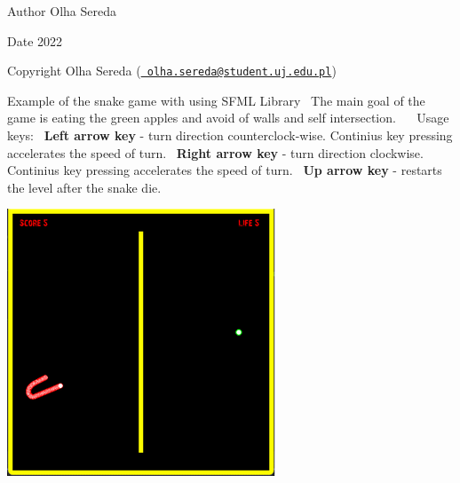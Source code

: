 \begin{DoxyAuthor}{Author}
Olha Sereda 
\end{DoxyAuthor}
\begin{DoxyDate}{Date}
2022 
\end{DoxyDate}
\begin{DoxyCopyright}{Copyright}
Olha Sereda (\href{mailto:olha.sereda@student.uj.edu.pl}{\texttt{ olha.\+sereda@student.\+uj.\+edu.\+pl}})
\end{DoxyCopyright}
Example of the snake game with using SFML Library~\newline
The main goal of the game is eating the green apples and avoid of walls and self intersection.~\newline
~\newline
Usage keys\+:~\newline
{\bfseries{Left arrow key}} -\/ turn direction counterclock-\/wise. Continius key pressing accelerates the speed of turn.~\newline
{\bfseries{Right arrow key}} -\/ turn direction clockwise. Continius key pressing accelerates the speed of turn.~\newline
{\bfseries{Up arrow key}} -\/ restarts the level after the snake die.~\newline
~\newline
 
\begin{DoxyInlineImage}
\includegraphics[height=\baselineskip,keepaspectratio=true]{snake1.png}%
\end{DoxyInlineImage}
     
